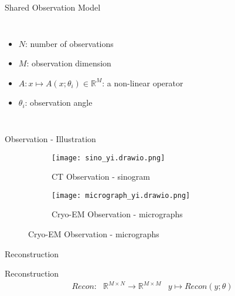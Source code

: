 \begin{frame}{Shared Observation Model}
\begin{columns}[T]

    \begin{itemize}
        \item<3-> \alert<3>{$N$: number of observations}
        \item<3-> \alert<3>{$M$: observation dimension}
        \item<4-> \alert<4>{$A: x \mapsto A(x; \theta_i) \in \mathbb{R}^M$: a non-linear operator}
        \item<4-> \alert<4>{$\theta_i$: observation angle}
    \end{itemize}

    \end{columns}
    
\end{frame}

\begin{frame}{Observation - Illustration }

    \begin{figure}
    \centering
    \begin{subfigure}{0.36\textwidth}
        \texttt{[image: sino\_yi.drawio.png]}
        \caption{CT Observation - sinogram}
    \end{subfigure}
    \begin{subfigure}[t]{0.6\textwidth}
        \texttt{[image: micrograph\_yi.drawio.png]}
        \caption{Cryo-EM Observation - micrographs}
    \end{subfigure}
\end{figure}

\end{frame}


\begin{frame}{Reconstruction}
    \pause
  
    \begin{block}{Reconstruction}
        \begin{equation}
            \begin{aligned}
                \textit{Recon} : & \mathbb{R}^{M \times N} \to \mathbb{R}^{M \times M} & y \mapsto Recon(y; \theta)
            \end{aligned}
        \end{equation}
    \end{block}
\end{frame}



